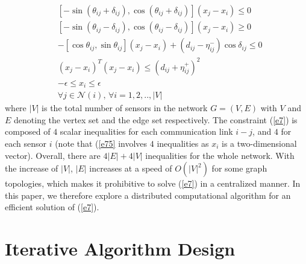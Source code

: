 \documentclass[journal]{IEEEtran}
\begin{document}
\begin{subequations}\label{e7}
\begin{align}
&[-\sin(\theta_{ij}+\delta_{ij}),\cos(\theta_{ij}+\delta_{ij})](x_j-x_i)\leq 0\label{e71}\\
&[-\sin(\theta_{ij}-\delta_{ij}),\cos(\theta_{ij}-\delta_{ij})](x_j-x_i)\geq 0\label{e72}\\
&-[\cos\theta_{ij}, \sin\theta_{ij}](x_j-x_i)+(d_{ij}-\eta^-_{ij})\cos\delta_{ij}\leq 0\label{e73}\\
&(x_j-x_i)^T(x_j-x_i) \leq (d_{ij}+\eta^+_{ij})^2\label{e74}\\
&-\epsilon\leq x_i\leq \epsilon\label{e75}\\
&\forall j\in\mathcal{N}(i),\,\forall i=1,2,..,|V|\nonumber
\end{align}
\end{subequations}
where $|V|$ is the total number of sensors in the network $G=(V, E)$ with $V$ and $E$ denoting the vertex set and the edge set respectively. The constraint (\ref{e7}) is composed of $4$ scalar inequalities for each communication link $i-j$, and $4$ for each sensor $i$ (note that (\ref{e75} involves $4$ inequalities as $x_i$ is a two-dimensional vector). Overall, there are $4|E|+4|V|$ inequalities for the whole network. With the increase of $|V|$, $|E|$ increases at a speed of $O(|V|^2)$ for some graph topologies, which makes it prohibitive to solve (\ref{e7}) in a centralized manner. In this paper, we therefore explore a distributed computational algorithm for an efficient solution of (\ref{e7}).

\section{Iterative Algorithm Design}
\end{document}
